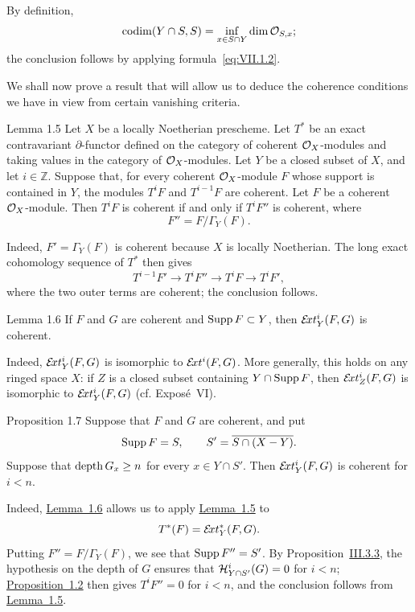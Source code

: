 By definition,
\[
  \operatorname{codim}(Y\cap S,S)=\inf_{x\in S\cap Y}\dim\mathcal O_{S,x};
\]
the conclusion follows by applying formula~\eqref{eq:VII.1.2}.

We shall now prove a result that will allow us to deduce the coherence
conditions we have in view from certain vanishing criteria.

\begin{sgastatement}{Lemma 1.5}
Let $X$ be a locally Noetherian prescheme. Let $T^{\ast}$ be an exact
contravariant $\partial$-functor defined on the category of coherent
$\mathcal O_X$-modules and taking values in the category of $\mathcal O_X$-modules. Let $Y$ be a
closed subset of $X$, and let $i\in\mathbb Z$. Suppose that, for every coherent
$\mathcal O_X$-module $F$ whose support is contained in $Y$, the modules $T^iF$ and
$T^{i-1}F$ are coherent. Let $F$ be a coherent $\mathcal O_X$-module. Then $T^iF$ is
coherent if and only if $T^iF''$ is coherent, where
\[
  F''=F/\Gamma_Y(F).
\]
\end{sgastatement}

Indeed, $F'=\Gamma_Y(F)$ is coherent because $X$ is locally Noetherian. The
long exact cohomology sequence of $T^{\ast}$ then gives
\[
  T^{i-1}F'\longrightarrow T^iF''\longrightarrow T^iF
  \longrightarrow T^iF',
\]
where the two outer terms are coherent; the conclusion follows.

\begin{sgastatement}{Lemma 1.6}
If $F$ and $G$ are coherent and $\operatorname{Supp} F\subset Y$, then
$\mathcal E\!xt_Y^i(F,G)$ is coherent.
\end{sgastatement}

Indeed, $\mathcal E\!xt_Y^i(F,G)$ is isomorphic to $\mathcal E\!xt^i(F,G)$. More
generally, this holds on any ringed space $X$: if $Z$ is a closed subset
containing $Y\cap\operatorname{Supp} F$, then $\mathcal E\!xt_Z^i(F,G)$ is isomorphic to
$\mathcal E\!xt_Y^i(F,G)$ (cf. Expos\'e~VI).

\begin{sgastatement}{Proposition 1.7}
Suppose that $F$ and $G$ are coherent, and put
\[
  \operatorname{Supp} F=S,\qquad S'=\overline{S\cap(X-Y)}.
\]
Suppose that $\operatorname{depth} G_x\geq n$ for every $x\in Y\cap S'$. Then
$\mathcal E\!xt_Y^i(F,G)$ is coherent for $i<n$.
\end{sgastatement}

Indeed, \hyperref[VII.1.6]{Lemma~1.6} allows us to apply \hyperref[VII.1.5]{Lemma~1.5} to
\[
  T^{\ast}(F)=\mathcal E\!xt_Y^{\ast}(F,G).
\]
Putting $F''=F/\Gamma_Y(F)$, we see that $\operatorname{Supp} F''=S'$. By
Proposition~\hyperref[III.3.3]{III.3.3}, the hypothesis on the depth of $G$ ensures that
$\mathcal H^i_{Y\cap S'}(G)=0$ for $i<n$; \hyperref[VII.1.2]{Proposition~1.2} then gives
$T^iF''=0$ for $i<n$, and the conclusion follows from \hyperref[VII.1.5]{Lemma~1.5}.

